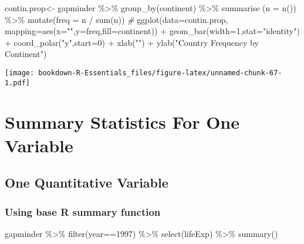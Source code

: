 \documentclass[
]{book}
\newenvironment{Shaded}{\begin{snugshade}}{\end{snugshade}}
\newcommand{\AttributeTok}[1]{\textcolor[rgb]{0.77,0.63,0.00}{#1}}
\newcommand{\CommentTok}[1]{\textcolor[rgb]{0.56,0.35,0.01}{\textit{#1}}}
\newcommand{\DecValTok}[1]{\textcolor[rgb]{0.00,0.00,0.81}{#1}}
\newcommand{\FunctionTok}[1]{\textcolor[rgb]{0.00,0.00,0.00}{#1}}
\newcommand{\NormalTok}[1]{#1}
\newcommand{\OtherTok}[1]{\textcolor[rgb]{0.56,0.35,0.01}{#1}}
\newcommand{\SpecialCharTok}[1]{\textcolor[rgb]{0.00,0.00,0.00}{#1}}
\newcommand{\StringTok}[1]{\textcolor[rgb]{0.31,0.60,0.02}{#1}}
\begin{document}
\begin{Shaded}
\begin{Highlighting}[]
\NormalTok{contin.prop}\OtherTok{\textless{}{-}}\NormalTok{ gapminder }\SpecialCharTok{\%\textgreater{}\%} 
  \FunctionTok{group\_by}\NormalTok{(continent) }\SpecialCharTok{\%\textgreater{}\%}
  \FunctionTok{summarise}\NormalTok{ (}\AttributeTok{n =} \FunctionTok{n}\NormalTok{()) }\SpecialCharTok{\%\textgreater{}\%}
  \FunctionTok{mutate}\NormalTok{(}\AttributeTok{freq =}\NormalTok{ n }\SpecialCharTok{/} \FunctionTok{sum}\NormalTok{(n))}
\CommentTok{\#}
\FunctionTok{ggplot}\NormalTok{(}\AttributeTok{data=}\NormalTok{contin.prop, }\AttributeTok{mapping=}\FunctionTok{aes}\NormalTok{(}\AttributeTok{x=}\StringTok{""}\NormalTok{,}\AttributeTok{y=}\NormalTok{freq,}\AttributeTok{fill=}\NormalTok{continent)) }\SpecialCharTok{+} 
  \FunctionTok{geom\_bar}\NormalTok{(}\AttributeTok{width=}\DecValTok{1}\NormalTok{,}\AttributeTok{stat=}\StringTok{"identity"}\NormalTok{) }\SpecialCharTok{+}
  \FunctionTok{coord\_polar}\NormalTok{(}\StringTok{"y"}\NormalTok{,}\AttributeTok{start=}\DecValTok{0}\NormalTok{) }\SpecialCharTok{+}
  \FunctionTok{xlab}\NormalTok{(}\StringTok{""}\NormalTok{) }\SpecialCharTok{+} \FunctionTok{ylab}\NormalTok{(}\StringTok{"Country Frequency by Continent"}\NormalTok{)}
\end{Highlighting}
\end{Shaded}

\texttt{[image: bookdown-R-Essentials\_files/figure-latex/unnamed-chunk-67-1.pdf]}

\hypertarget{summary-statistics-for-one-variable}{%
\chapter{Summary Statistics For One Variable}\label{summary-statistics-for-one-variable}}

\hypertarget{one-quantitative-variable}{%
\section{One Quantitative Variable}\label{one-quantitative-variable}}

\hypertarget{using-base-r-summary-function}{%
\subsection{Using base R summary function}\label{using-base-r-summary-function}}

\begin{Shaded}
\begin{Highlighting}[]
\NormalTok{gapminder }\SpecialCharTok{\%\textgreater{}\%} 
  \FunctionTok{filter}\NormalTok{(year}\SpecialCharTok{==}\DecValTok{1997}\NormalTok{) }\SpecialCharTok{\%\textgreater{}\%} 
  \FunctionTok{select}\NormalTok{(lifeExp) }\SpecialCharTok{\%\textgreater{}\%} 
  \FunctionTok{summary}\NormalTok{()}
\end{Highlighting}
\end{Shaded}
\end{document}
